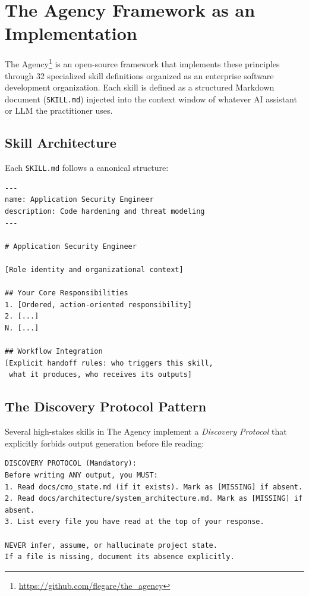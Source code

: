 \documentclass[11pt,a4paper]{article}
\begin{document}
\section{The Agency Framework as an Implementation}
\label{sec:agency}

The Agency\footnote{\url{https://github.com/flegare/the_agency}} is an
open-source framework that implements these principles through 32 specialized
skill definitions organized as an enterprise software development organization.
Each skill is defined as a structured Markdown document (\texttt{SKILL.md})
injected into the context window of whatever AI assistant or LLM the
practitioner uses.

\subsection{Skill Architecture}

Each \texttt{SKILL.md} follows a canonical structure:

\begin{lstlisting}[language={},caption={Canonical SKILL.md structure}]
---
name: Application Security Engineer
description: Code hardening and threat modeling
---

# Application Security Engineer

[Role identity and organizational context]

## Your Core Responsibilities
1. [Ordered, action-oriented responsibility]
2. [...]
N. [...]

## Workflow Integration
[Explicit handoff rules: who triggers this skill,
 what it produces, who receives its outputs]
\end{lstlisting}

\subsection{The Discovery Protocol Pattern}

Several high-stakes skills in The Agency implement a \emph{Discovery Protocol}
that explicitly forbids output generation before file reading:

\begin{lstlisting}[language={},caption={Discovery Protocol excerpt from historian/SKILL.md}]
DISCOVERY PROTOCOL (Mandatory):
Before writing ANY output, you MUST:
1. Read docs/cmo_state.md (if it exists). Mark as [MISSING] if absent.
2. Read docs/architecture/system_architecture.md. Mark as [MISSING] if absent.
3. List every file you have read at the top of your response.

NEVER infer, assume, or hallucinate project state.
If a file is missing, document its absence explicitly.
\end{lstlisting}
\end{document}
